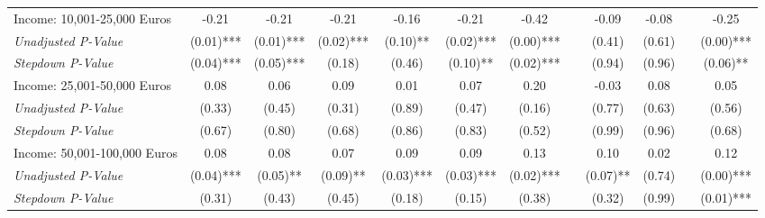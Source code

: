 \begin{tabular}{l c c c c c c c c c c c}
Income: 10,001-25,000 Euros & -0.21 & -0.21 & -0.21 & -0.16 & -0.21 & -0.42 & & -0.09 & -0.08 & & -0.25 \\
\quad \textit{Unadjusted P-Value} & (0.01)*** & (0.01)*** & (0.02)*** & (0.10)** & (0.02)*** & (0.00)*** & & (0.41) & (0.61) & & (0.00)*** \\
\quad \textit{Stepdown P-Value} & (0.04)*** & (0.05)*** & (0.18) & (0.46) & (0.10)** & (0.02)*** & & (0.94) & (0.96) & & (0.06)** \\
Income: 25,001-50,000 Euros & 0.08 & 0.06 & 0.09 & 0.01 & 0.07 & 0.20 & & -0.03 & 0.08 & & 0.05 \\
\quad \textit{Unadjusted P-Value} & (0.33) & (0.45) & (0.31) & (0.89) & (0.47) & (0.16) & & (0.77) & (0.63) & & (0.56) \\
\quad \textit{Stepdown P-Value} & (0.67) & (0.80) & (0.68) & (0.86) & (0.83) & (0.52) & & (0.99) & (0.96) & & (0.68) \\
Income: 50,001-100,000 Euros & 0.08 & 0.08 & 0.07 & 0.09 & 0.09 & 0.13 & & 0.10 & 0.02 & & 0.12 \\
\quad \textit{Unadjusted P-Value} & (0.04)*** & (0.05)** & (0.09)** & (0.03)*** & (0.03)*** & (0.02)*** & & (0.07)** & (0.74) & & (0.00)*** \\
\quad \textit{Stepdown P-Value} & (0.31) & (0.43) & (0.45) & (0.18) & (0.15) & (0.38) & & (0.32) & (0.99) & & (0.01)*** \\
\bottomrule
\end{tabular}
